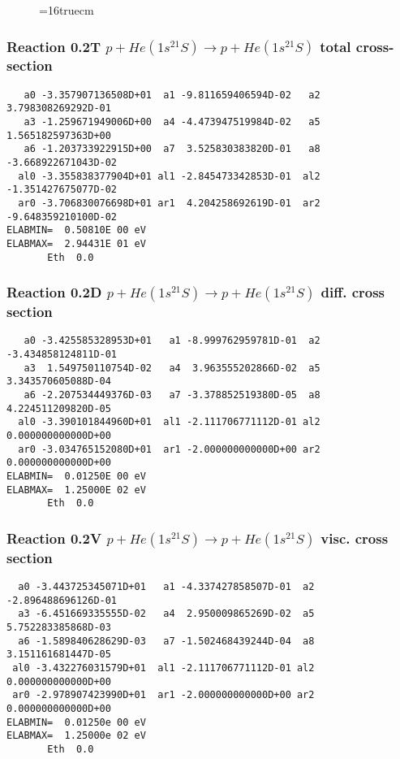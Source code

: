 \documentclass[12pt,dvipdfmx]{article}
\begin{document}
\begin{figure} \label{0.1}
\epsfxsize=16truecm
\end{figure}
\newpage

\subsubsection{
Reaction 0.2T   $ p + He(1s^21S) \rightarrow p + He (1s^21S)$ total cross-section
}



\begin{small}\begin{verbatim}
   a0 -3.357907136508D+01  a1 -9.811659406594D-02   a2  3.798308269292D-01
   a3 -1.259671949006D+00  a4 -4.473947519984D-02   a5  1.565182597363D+00
   a6 -1.203733922915D+00  a7  3.525830383820D-01   a8 -3.668922671043D-02
  al0 -3.355838377904D+01 al1 -2.845473342853D-01  al2 -1.351427675077D-02
  ar0 -3.706830076698D+01 ar1  4.204258692619D-01  ar2 -9.648359210100D-02
ELABMIN=  0.50810E 00 eV
ELABMAX=  2.94431E 01 eV
       Eth  0.0
\end{verbatim}\end{small}

\subsubsection{
Reaction 0.2D    $p + He(1s^21S) \rightarrow p + He (1s^21S) $ diff. cross
section }


\begin{small}\begin{verbatim}
   a0 -3.425585328953D+01   a1 -8.999762959781D-01  a2 -3.434858124811D-01
   a3  1.549750110754D-02   a4  3.963555202866D-02  a5  3.343570605088D-04
   a6 -2.207534449376D-03   a7 -3.378852519380D-05  a8  4.224511209820D-05
  al0 -3.390101844960D+01  al1 -2.111706771112D-01 al2  0.000000000000D+00
  ar0 -3.034765152080D+01  ar1 -2.000000000000D+00 ar2  0.000000000000D+00
ELABMIN=  0.01250E 00 eV
ELABMAX=  1.25000E 02 eV
       Eth  0.0
\end{verbatim}\end{small}


\subsubsection{
Reaction 0.2V   $ p + He(1s^21S) \rightarrow p + He (1s^21S) $ visc. cross
section }


\begin{small}\begin{verbatim}
  a0 -3.443725345071D+01   a1 -4.337427858507D-01  a2 -2.896488696126D-01
  a3 -6.451669335555D-02   a4  2.950009865269D-02  a5  5.752283385868D-03
  a6 -1.589840628629D-03   a7 -1.502468439244D-04  a8  3.151161681447D-05
 al0 -3.432276031579D+01  al1 -2.111706771112D-01 al2  0.000000000000D+00
 ar0 -2.978907423990D+01  ar1 -2.000000000000D+00 ar2  0.000000000000D+00
ELABMIN=  0.01250e 00 eV
ELABMAX=  1.25000e 02 eV
       Eth  0.0
\end{verbatim}\end{small}
\end{document}

